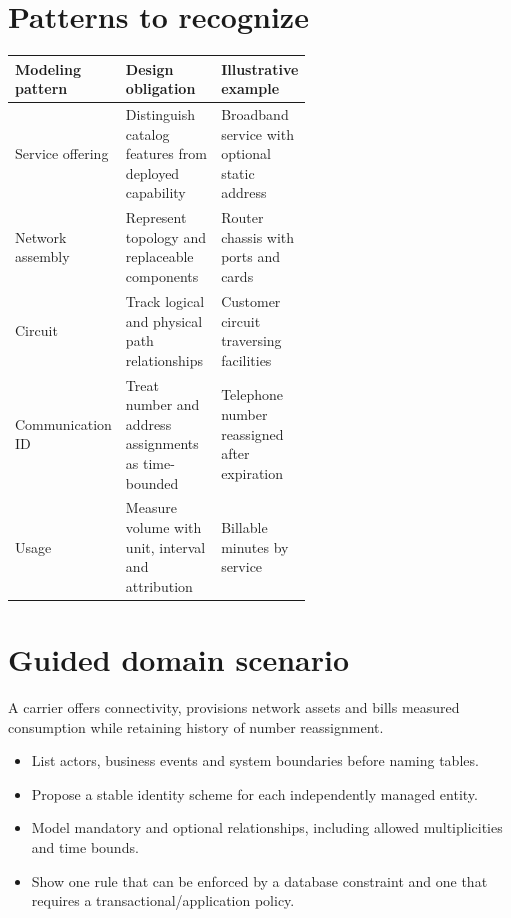 \documentclass[11pt,letterpaper]{article}
\begin{document}
\section{Patterns to recognize}
\begin{tabularx}{\linewidth}{@{}>{\raggedright\arraybackslash}p{0.22\linewidth} >{\raggedright\arraybackslash}p{0.37\linewidth}>{\raggedright\arraybackslash}X@{}}
\toprule
\textbf{Modeling pattern} & \textbf{Design obligation} & \textbf{Illustrative example} \\ 
\midrule
Service offering & Distinguish catalog features from deployed capability & Broadband service with optional static address \\ 
Network assembly & Represent topology and replaceable components & Router chassis with ports and cards \\ 
Circuit & Track logical and physical path relationships & Customer circuit traversing facilities \\ 
Communication ID & Treat number and address assignments as time-bounded & Telephone number reassigned after expiration \\ 
Usage & Measure volume with unit, interval and attribution & Billable minutes by service \\ 
\bottomrule
\end{tabularx}

\section{Guided domain scenario}
A carrier offers connectivity, provisions network assets and bills measured consumption while retaining history of number reassignment.

\begin{itemize}
\item List actors, business events and system boundaries before naming tables.
\item Propose a stable identity scheme for each independently managed entity.
\item Model mandatory and optional relationships, including allowed multiplicities and time bounds.
\item Show one rule that can be enforced by a database constraint and one that requires a transactional/application policy.
\end{itemize}
\end{document}
